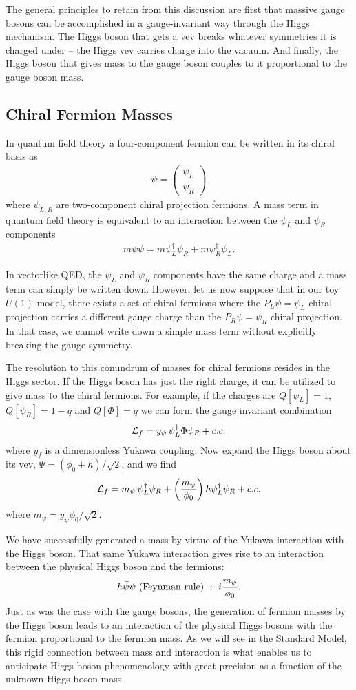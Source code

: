 \documentclass[12pt]{article}
\def\beq{\begin{eqnarray}}
\def\eeq{\end{eqnarray}}
\begin{document}
The general principles to retain from this discussion are first that massive gauge bosons can be accomplished in a gauge-invariant way through the Higgs mechanism. The Higgs boson that gets a vev breaks whatever symmetries it is charged under -- the Higgs vev carries charge into the vacuum. And finally, the Higgs boson that gives mass to the gauge boson couples to it proportional to the gauge boson mass.

\subsection{Chiral Fermion Masses}


In quantum field theory a four-component fermion can be written in its chiral basis as
\beq
\psi=\left( \begin{array}{c} \psi_L \\ \psi_R \end{array}\right)
\eeq
where $\psi_{L,R}$ are two-component chiral projection fermions. A mass term in quantum field theory is equivalent to an interaction between the $\psi_L$ and $\psi_R$ components
\beq
m\bar \psi\psi = m\psi_L^\dagger\psi_R+m\psi^\dagger_R \psi_L.
\eeq

In vectorlike QED, the $\psi_L$ and $\psi_R$ components have the same charge and a mass term can simply be written down. However, let us now suppose that in our toy $U(1)$ model, there exists a set of chiral fermions where the $P_L\psi=\psi_L$ chiral projection carries a different gauge charge than the $P_R\psi=\psi_R$ chiral projection.  
In that case, we cannot write down a simple mass term without explicitly breaking the gauge symmetry.

The resolution to this conundrum of masses for chiral fermions resides in the Higgs sector. If the Higgs boson has just the right charge, it can be utilized to give mass to the chiral fermions. For example, if the charges are $Q[\psi_L]=1$, $Q[\psi_R]=1-q$ and $Q[\Phi]=q$ we can form the gauge invariant combination 
\beq
{\cal L}_f=y_\psi\, \psi_L^\dagger \Phi\psi_R+c.c.
\eeq
where $y_f$ is a dimensionless Yukawa coupling.  Now expand the Higgs boson about its vev, $\Psi=(\phi_0+h)/\sqrt{2}$, and we find
\beq
{\cal L}_f=m_\psi\, \psi_L^\dagger\psi_R+ \left(\frac{m_\psi}{\phi_0} \right)h \psi_L^\dagger\psi_R+c.c.
\eeq
where $m_\psi=y_\psi \phi_0/\sqrt{2}$.

We have successfully generated a mass by virtue of the Yukawa interaction with the Higgs boson. That same Yukawa interaction gives rise to an interaction between the physical Higgs boson and the fermions:
\beq
h\bar\psi\psi~{\rm (Feynman~rule)}~:~ i\frac{m_\psi}{\phi_0}.
\eeq
Just as was the case with the gauge bosons, the generation of fermion masses by the Higgs boson leads to an interaction of the physical Higgs bosons with the fermion proportional to the fermion mass.
As we will see in the Standard Model, this rigid connection between mass and interaction is what enables us to anticipate Higgs boson phenomenology with great precision as a function of the unknown Higgs boson mass.
\end{document}
